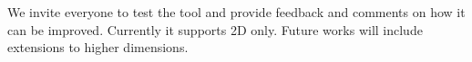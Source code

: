 \documentclass[a4paper,english,numberwithinsect]{eurocg26}
\begin{document}
We invite everyone %
to test the tool and provide feedback and comments on how it can be improved. Currently it supports 2D only. Future works will include extensions to higher dimensions.













\end{document}
